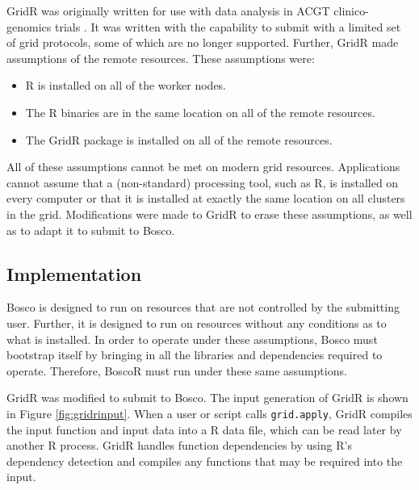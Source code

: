 GridR was originally written for use with data analysis in ACGT clinico-genomics trials \cite{wegener2007gridr}.  It was written with the capability to submit with a limited set of grid protocols, some of which are no longer supported.  Further, GridR made assumptions of the remote resources.  These assumptions were:

\begin{itemize}
\item R is installed on all of the worker nodes.
\item The R binaries are in the same location on all of the remote resources.
\item The GridR package is installed on all of the remote resources.
\end{itemize}

All of these assumptions cannot be met on modern grid resources.  Applications cannot assume that a (non-standard) processing tool, such as R, is installed on every computer or   that it is installed at exactly the same location on all clusters in the grid.  Modifications were made to GridR to erase these assumptions, as well as to adapt it to submit to Bosco.

\subsection{Implementation}
\label{sec:boscorimplementation}


Bosco is designed to run on resources that are not controlled by the submitting user.  Further, it is designed to run on resources without any conditions as to what is installed.  In order to operate under these assumptions, Bosco must bootstrap itself by bringing in all the libraries and dependencies required to operate.  Therefore, BoscoR must run under these same assumptions.

GridR was modified to submit to Bosco.  The input generation of GridR is shown in Figure \ref{fig:gridrinput}.  When a user or script calls \texttt{grid.apply}, GridR compiles the input function and input data into a R data file, which can be read later by another R process.  GridR handles function dependencies by using R's dependency detection and compiles any functions that may be required into the input.  

